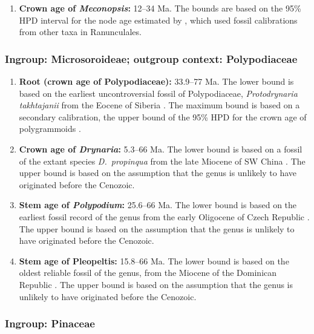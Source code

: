 \begin{enumerate}
\item \textbf{Crown age of \textit{Meconopsis}:} 12--34 Ma. The bounds
  are based on the 95\% HPD interval for the node age estimated by
  \citet{Xiao2013}, which used fossil calibrations from other taxa in
  Ranunculales.
\end{enumerate}

\subsubsection*{Ingroup: Microsoroideae; outgroup context:
  Polypodiaceae}


\begin{enumerate}
\item \textbf{Root (crown age of Polypodiaceae):} 33.9--77 Ma. The
  lower bound is based on the earliest uncontroversial fossil of
  Polypodiaceae, \textit{Protodrynaria takhtajanii} from the Eocene of
  Siberia \citep{Vikulin1987}. The maximum bound is based on a
  secondary calibration, the upper bound of the 95\% HPD for the crown
  age of polygrammoids \citep{Schuettpelz2009}.

\item \textbf{Crown age of \textit{Drynaria}:} 5.3--66 Ma. The lower
  bound is based on a fossil of the extant species
  \textit{D.~propinqua} from the late Miocene of SW China
  \citep{Wen2013}. The upper bound is based on the assumption that the
  genus is unlikely to have originated before the Cenozoic.

\item \textbf{Stem age of \textit{Polypodium}:} 25.6--66 Ma. The
  lower bound is based on the earliest fossil record of the genus
  from the early Oligocene of Czech Republic \citep{Kvacek2001}. The
  upper bound is based on the assumption that the genus is unlikely to
  have originated before the Cenozoic.

\item \textbf{Stem age of Pleopeltis:} 15.8--66 Ma. The lower bound
  is based on the oldest reliable fossil of the genus, from the
  Miocene of the Dominican Republic \citep{Schneider2015}. The upper
  bound is based on the assumption that the genus is unlikely to have
  originated before the Cenozoic.
\end{enumerate}

\subsubsection*{Ingroup: Pinaceae}

